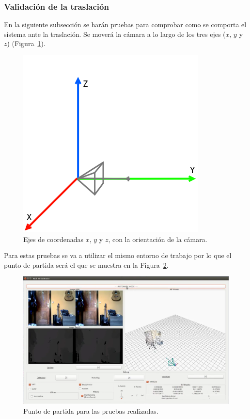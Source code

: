 \subsubsection{Validación de la traslación}

En la siguiente subsección se harán pruebas para comprobar como se comporta el sistema ante la traslación. Se moverá la cámara a lo largo de los tres ejes ($x$, $y$ y $z$) (Figura~\ref{fig:xyz}).

\begin{figure}[th]
\centering
\includegraphics[scale=0.3]{Figures/xyz.png}
\decoRule
\caption[Ejes de coordenadas $x$, $y$ y $z$]{Ejes de coordenadas $x$, $y$ y $z$, con la orientación de la cámara.}
\label{fig:xyz}
\end{figure}

Para estas pruebas se va a utilizar el mismo entorno de trabajo por lo que el punto de partida será el que se muestra en la Figura~\ref{fig:init}.

\begin{figure}[th]
\centering
\includegraphics[scale=0.3]{Figures/tests/init.png}
\decoRule
\caption[Punto de partida para las pruebas de traslación y rotación]{Punto de partida para las pruebas realizadas.}
\label{fig:init}
\end{figure}

